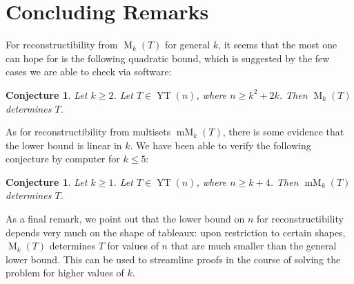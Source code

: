 \documentclass[12pt]{amsart}
\newtheorem{conjecture}[theorem]{Conjecture}
\theoremstyle{definition}
\theoremstyle{remark}
\numberwithin{equation}{section}
\numberwithin{figure}{section}
\newcommand{\YT}{\operatorname{YT}}
\newcommand{\M}{\operatorname{M}}
\newcommand{\mM}{\operatorname{mM}}
\begin{document}
%
%
%

\section{Concluding Remarks}

For reconstructibility from $\M_k(T)$ for general $k$, it seems that the most one can hope for is the following quadratic bound, which is suggested by the few cases we are able to check via software:

\begin{conjecture}
    \label{conj:k^2 + 2k}
    Let $k \geq 2$.  Let $T \in \YT(n)$, where $n \geq k^2 + 2k$.  Then $\M_k(T)$ determines $T$.
\end{conjecture}

As for reconstructibility from multisets $\mM_k(T)$, there is some evidence that the lower bound is linear in $k$.  We have been able to verify the following conjecture by computer for $k \leq 5$:

\begin{conjecture}
\label{conj:k+4}
    Let $k \geq 1$.  Let $T \in \YT(n)$, where $n \geq k + 4$.  Then $\mM_k(T)$ determines $T$.
\end{conjecture}

As a final remark, we point out that the lower bound on $n$ for reconstructibility depends very much on the shape of tableaux: upon restriction to certain shapes, $\M_k(T)$ determines $T$ for values of $n$ that are much smaller than the general lower bound.  This can be used to streamline proofs in the course of solving the problem for higher values of $k$.





\end{document}
